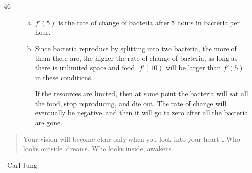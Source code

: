 \documentclass[letterpaper, landscape]{exam}
\begin{document}
\begin{description}
      \item[46]
        \begin{enumerate}[(a)]
          \item $f'(5)$ is the rate of change of bacteria after 5 hours in bacteria per hour.

          \item Since bacteria reproduce by splitting into two bacteria, the more of them
            there are, the higher the rate of change of bacteria, as long as there is
            unlimited space and food. $f'(10)$ will be larger than $f'(5)$ in these
            conditions.

            If the resources are limited, then at some point the bacteria will eat all the
            food, stop reproducing, and die out. The rate of change will eventually be
            negative, and then it will go to zero after all the bacteria are gone. 

        \end{enumerate}
     \end{description}
 
 
  \else
    \vspace{10 cm}
    \begin{quote}
      \begin{em}
        Your vision will become clear only when you look into your heart \dots Who looks
        outside, dreams. Who looks inside, awakens.
      \end{em}
    \end{quote}
    \hspace{2 cm} --Carl Jung
  \fi
\end{document}
